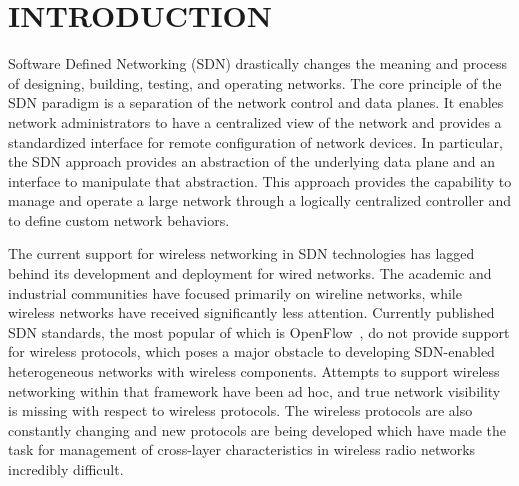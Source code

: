 %
%
%



\pagestyle{plain} %
\setcounter{page}{1}


\chapter{\uppercase {Introduction}}

\label{sec:intro}
Software Defined Networking (SDN) drastically changes the meaning and process of designing, building, testing, and operating networks. The core principle of the SDN paradigm is a separation of the network control and data planes. It enables network administrators to have a centralized view of the network and provides a standardized interface for remote configuration of network devices. In particular, the SDN approach provides an abstraction of the underlying data plane and an interface to manipulate that abstraction. This approach provides the capability to manage and operate a large network through a logically centralized controller and to define custom network behaviors.

The current support for wireless networking in SDN technologies has lagged behind its development and deployment for wired networks. The academic and industrial communities have focused primarily on wireline networks, while wireless networks have received significantly less attention.
Currently published SDN standards, the most popular of which is OpenFlow~\cite{openflow}, do not provide support for wireless protocols, which poses a major obstacle to developing SDN-enabled heterogeneous networks with wireless components. Attempts to support wireless networking within that framework have been ad hoc, and true network visibility is missing with respect to wireless protocols. The wireless protocols are also constantly changing and new protocols are being developed which have made the task for management of cross-layer characteristics in wireless radio networks incredibly difficult.

